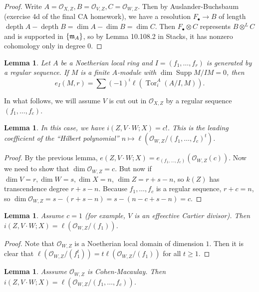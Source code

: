 \documentclass[leqno, openany]{memoir}
\newtheorem{lem}[thm]{Lemma}
\theoremstyle{definition}
\theoremstyle{remark}
\theoremstyle{plain}
\theoremstyle{definition}
\theoremstyle{remark}
\newcommand{\mc}[1]{\mathcal{#1}}
\newcommand{\mf}[1]{\mathfrak{#1}}
\DeclareMathOperator{\Supp}{Supp}
\DeclareMathOperator{\Tor}{Tor}
\DeclareMathOperator{\depth}{depth}
\begin{document}
\begin{proof}
    Write $A = \mc{O}_{X,Z}, B = \mc{O}_{V,Z}, C = \mc{O}_{W,Z}$. Then by Auslander-Buchsbaum (exercise 4d of the final CA homework), we have a resolution $F_{\bullet} \to B$ of length $\depth A - \depth B = \dim A - \dim B = \dim C$. Then $F_{\bullet} \otimes C$ represents $B \otimes^L C$ and is supported in $\qty{ \mf{m}_A }$, so by Lemma 10.108.2 in Stacks, it has nonzero cohomology only in degree $0$.
\end{proof}

\begin{lem}
    Let $A$ be a Noetherian local ring and $I = (f_1, \ldots, f_r)$ is generated by a regular sequence. If $M$ is a finite $A$-module with $\dim \Supp M/IM = 0$, then
    \[ e_I(M,r) = \sum {(-1)}^i \ell(\Tor_i^A(A/I, M)). \]
\end{lem}

In what follows, we will assume $V$ is cut out in $\mc{O}_{X,Z}$ by a regular sequence $(f_1, \ldots, f_c)$.
\begin{lem}
    In this case, we have $i(Z, V \cdot W; X) = c{!}$. This is the leading coefficient of the ``Hilbert polynomial'' $n \mapsto \ell(\mc{O}_{W,Z} / {(f_1, \ldots, f_c)}^t)$.
\end{lem}

\begin{proof}
    By the previous lemma, $e(Z, V \cdot W; X) = e_{(f_1, \ldots, f_c)}(\mc{O}_{W,Z}(c))$. Now we need to show that $\dim \mc{O}_{W,Z} = c$. But now if $\dim V = r, \dim W = s, \dim X = n$, $\dim Z = r+s-n$, so $k(Z)$ has transcendence degree $r+s-n$. Because $f_1, \ldots, f_c$ is a regular sequence, $r+c=n$, so $\dim \mc{O}_{W,Z} = s-(r+s-n) = s-(n-c+s-n)=c$.
\end{proof}

\begin{lem}
    Assume $c = 1$ (for example, $V$ is an effeective Cartier divisor). Then $i(Z, V \cdot W;X) = \ell(\mc{O}_{W,Z} / (f_1))$.
\end{lem}

\begin{proof}
    Note that $\mc{O}_{W,Z}$ is a Noetherian local domain of dimension $1$. Then it is clear that $\ell(\mc{O}_{W,Z}/(f_1^t)) = t \ell(\mc{O}_{W,Z} / (f_1))$ for all $t \geq 1$.
\end{proof}

\begin{lem}
    Asssume $\mc{O}_{W,Z}$ is Cohen-Macaulay. Then $i(Z, V \cdot W; X) = \ell(\mc{O}_{W,Z} / (f_1, \ldots, f_c))$.
\end{lem}
\end{document}

